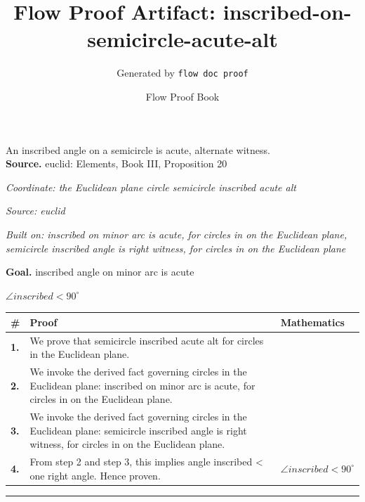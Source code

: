 \documentclass[11pt]{article}
\title{Flow Proof Artifact: inscribed-on-semicircle-acute-alt}
\author{Generated by \texttt{flow doc proof}}
\date{Flow Proof Book}
\theoremstyle{definition}
\begin{document}
\maketitle
An inscribed angle on a semicircle is acute, alternate witness.\\[0.5em]
\textbf{Source.} euclid: Elements, Book III, Proposition 20\\[0.5em]
\bigskip
{}\par
\smallskip\noindent\textit{Coordinate: the Euclidean plane \cdot circle \cdot semicircle inscribed acute alt}\par
\smallskip\noindent\textit{Source: euclid}\par
\smallskip\noindent\textit{Built on: inscribed on minor arc is acute, for circles in on the Euclidean plane, semicircle inscribed angle is right witness, for circles in on the Euclidean plane}\par
\medskip
\noindent\textbf{Goal.} inscribed angle on minor arc is acute\par
\noindent$\displaystyle \angle inscribed < 90^\circ$\par
\medskip
\noindent
\begin{tabular}{@{} >{\raggedright\arraybackslash}p{} >{\raggedright\arraybackslash}p{} >{\raggedleft\arraybackslash}p{} @{}}
\textbf{\#} & \textbf{Proof} & \textbf{Mathematics} \\
\midrule
\textbf{1.} & We prove that semicircle inscribed acute alt for circles in the Euclidean plane. & \\[0.45em]
\textbf{2.} & We invoke the derived fact governing circles in the Euclidean plane: inscribed on minor arc is acute, for circles in on the Euclidean plane. & \\[0.45em]
\textbf{3.} & We invoke the derived fact governing circles in the Euclidean plane: semicircle inscribed angle is right witness, for circles in on the Euclidean plane. & \\[0.45em]
\textbf{4.} & From step 2 and step 3, this implies angle inscribed < one right angle. Hence proven. & $\displaystyle \angle inscribed < 90^\circ$ \\[0.45em]
\bottomrule
\end{tabular}
\label{thm:Geometry-circle-semicircle_inscribed_acute_alt}
\par\medskip\hrule
\end{document}
